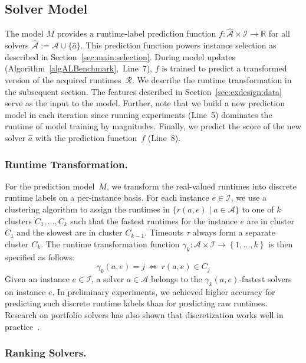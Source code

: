 \documentclass[runningheads]{llncs}
\begin{document}
\subsection{Solver Model}
\label{sec:main:model}

The model $M$ provides a runtime-label prediction function $f : \mathcal{\hat A} \times \mathcal{I} \rightarrow \mathbb{R}$ for all solvers $\mathcal{\hat A} := \mathcal{A} \cup \lbrace \hat a \rbrace$.
This prediction function powers instance selection as described in Section~\ref{sec:main:selection}.
During model updates (Algorithm~\ref{algALBenchmark},~Line~7), $f$ is trained to predict a transformed version of the acquired runtimes~$\mathcal{R}$.
We describe the runtime transformation in the subsequent section.
The features described in Section~\ref{sec:exdesign:data} serve as the input to the model.
Further, note that we build a new prediction model in each iteration since running experiments (Line~5) dominates the runtime of model training by magnitudes.
Finally, we predict the score of the new solver $\hat a$ with the prediction function~$f$ (Line~8).

\subsubsection{Runtime Transformation.}

For the prediction model~$M$, we transform the real-valued runtimes into discrete runtime labels on a per-instance basis.
For each instance $e \in \mathcal{I}$, we use a clustering algorithm to assign the runtimes in $\bigl\{ r(a, e) \mid a \in \mathcal{A} \bigr\}$ to one of $k$ clusters $C_1, \dots, C_k$ such that the fastest runtimes for the instance $e$ are in cluster $C_1$ and the slowest are in cluster $C_{k-1}$.
Timeouts $\tau$ always form a separate cluster $C_{k}$.
The runtime transformation function $\gamma_k : {\mathcal{A} \times \mathcal{I}} \rightarrow \left\lbrace 1, \dots, k \right\rbrace$ is then specified as follows:
%
$$\gamma_k(a, e) = j ~\Leftrightarrow~ r(a, e) \in C_j$$
%
Given an instance $e \in \mathcal{I}$, a solver $a \in \mathcal{A}$ belongs to the $\gamma_k(a, e)$-fastest solvers on instance $e$. 
In preliminary experiments, we achieved higher accuracy for predicting such discrete runtime labels than for predicting raw runtimes.
Research on portfolio solvers has also shown that discretization works well in practice~\cite{CollauttiMMO13,NgokoCT19}.

\subsubsection{Ranking Solvers.}
\end{document}
